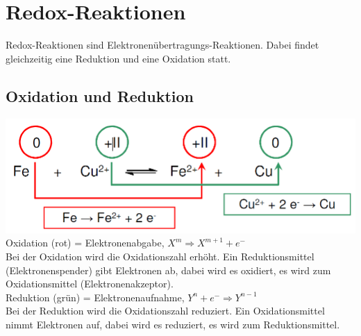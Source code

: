 \section{Redox-Reaktionen}
Redox-Reaktionen sind Elektronenübertragungs-Reaktionen. Dabei findet gleichzeitig eine Reduktion und eine Oxidation statt.

\subsection{Oxidation und Reduktion}
\includegraphics[width=0.6\linewidth]{images/9_Redox_Reaktion.png}\\
Oxidation (rot) = Elektronenabgabe, $X^m \Rightarrow X^{m+1} + e{^-}$\\
Bei der Oxidation wird die Oxidationszahl erhöht. Ein Reduktionsmittel (Elektronenspender) gibt Elektronen ab, dabei wird es oxidiert, es wird zum Oxidationsmittel (Elektronenakzeptor).\\

Reduktion (grün) = Elektronenaufnahme, $Y^n + e{^-} \Rightarrow Y^{n-1}$\\
Bei der Reduktion wird die Oxidationszahl reduziert. Ein Oxidationsmittel nimmt Elektronen auf, dabei wird es reduziert, es wird zum Reduktionsmittel.\\

